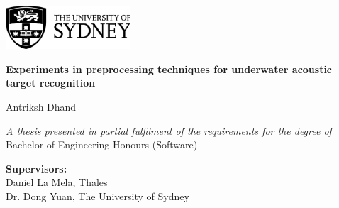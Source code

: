 \begin{titlepage}
    \vspace*{1cm}

    \begin{flushleft}
        \begin{center}
            \includegraphics[width=0.35\textwidth]{img/ch0_frontmatter/usyd_logo_full.png}
    
        \vspace{3cm} 
    
        {\LARGE \textbf{Experiments in preprocessing techniques for underwater acoustic target recognition}}
    
        \vspace{1.5cm} 
        
        {\Large Antriksh Dhand} 


        

        \vfill
        
        \textit{A thesis presented in partial fulfilment of the requirements for the degree of\\[3pt]}
        Bachelor of Engineering Honours (Software)
        
        \vspace{2.75cm}
    
        \textbf{Supervisors:}\\
        Daniel La Mela, Thales\\
        Dr. Dong Yuan, The University of Sydney
    

\end{center}
\end{flushleft}
\end{titlepage}
